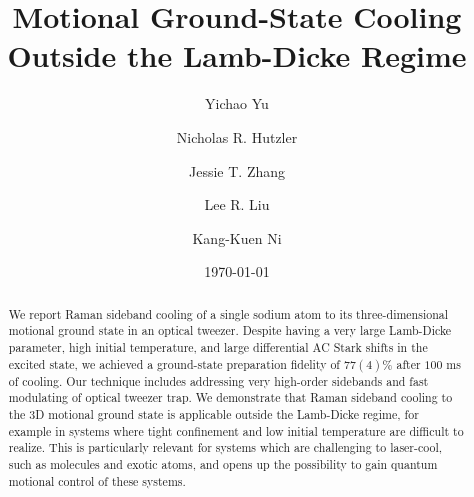 \documentclass[aps,prl,twocolumn,groupedaddress]{revtex4-1}
\begin{document}
\title{Motional Ground-State Cooling Outside the Lamb-Dicke Regime}
\author{Yichao Yu}
\author{Nicholas R. Hutzler}
\author{Jessie T. Zhang}
\author{Lee R. Liu}
\author{Kang-Kuen Ni}

\date{\today}

\begin{abstract}
  We report Raman sideband cooling of a single sodium atom to its three-dimensional
  motional ground state in an optical tweezer.
  Despite having a very large Lamb-Dicke parameter, high initial temperature, and
  large differential AC Stark shifts in the excited state,
  we achieved a ground-state preparation fidelity of $77(4)\%$ after $100$ ms of cooling.
  Our technique includes addressing very high-order sidebands and
  fast modulating of optical tweezer trap.
  We demonstrate that Raman sideband cooling to the 3D motional ground state is applicable
  outside the Lamb-Dicke regime, for example in
  systems where tight confinement and low initial temperature are difficult to realize.
  This is particularly relevant for systems which are challenging to laser-cool,
  such as molecules and exotic atoms,
  and opens up the possibility to gain quantum motional control of these systems.
\end{abstract}

\maketitle
\end{document}
